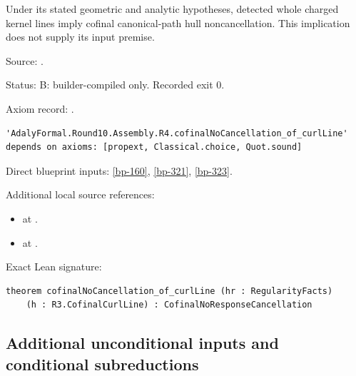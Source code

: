\begin{theorem}[bp-324]
\label{bp-324}
\leanok
Under its stated geometric and analytic hypotheses, detected whole charged kernel lines imply cofinal canonical-path hull noncancellation. This implication does not supply its input premise.

\par Source: \texttt{}.
\par Status: B: builder-compiled only. Recorded exit 0.
\par Axiom record: \texttt{}.
\begin{verbatim}
'AdalyFormal.Round10.Assembly.R4.cofinalNoCancellation_of_curlLine' depends on axioms: [propext, Classical.choice, Quot.sound]
\end{verbatim}
\par Direct blueprint inputs: \ref{bp-160}, \ref{bp-321}, \ref{bp-323}.
\par Additional local source references:
\begin{itemize}
\item \texttt{} at \texttt{}.
\item \texttt{} at \texttt{}.
\end{itemize}
\par Exact Lean signature:
\begin{verbatim}
theorem cofinalNoCancellation_of_curlLine (hr : RegularityFacts)
    (h : R3.CofinalCurlLine) : CofinalNoResponseCancellation
\end{verbatim}
\end{theorem}

\subsection{Additional unconditional inputs and conditional subreductions}

